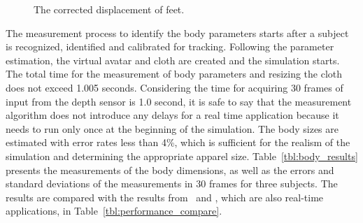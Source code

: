 \begin{figure}[htbp]
	\begin{center} 
	\end{center}
	\caption{The corrected displacement of feet.}
	\label{fig:footskating}
\end{figure}

The measurement process to identify the body parameters starts after a subject is recognized, identified and calibrated for tracking. Following the parameter estimation, the virtual avatar and cloth are created and the simulation starts. The total time for the measurement of body parameters and resizing the cloth does not exceed 1.005 seconds. Considering the time for acquiring 30 frames of input from the depth sensor is 1.0 second, it is safe to say that the measurement algorithm does not introduce any delays for a real time application because it needs to run only once at the beginning of the simulation. The body sizes are estimated with error rates less than 4\%, which is sufficient for the realism of the simulation and determining the appropriate apparel size. Table~\ref{tbl:body_results} presents the measurements of the body dimensions, as well as the errors and standard deviations of the measurements in 30 frames for three subjects. The results are compared with the results from~\cite{Giovanni2012} and \cite{Samejima2012}, which are also real-time applications, in Table~\ref{tbl:performance_compare}.

